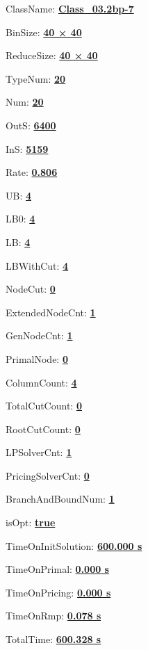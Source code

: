 \documentclass[11pt]{article}
\begin{document}
\pagestyle{empty}


ClassName: \underline{\textbf{Class_03.2bp-7}}
\par
BinSize: \underline{\textbf{40 × 40}}
\par
ReduceSize: \underline{\textbf{40 × 40}}
\par
TypeNum: \underline{\textbf{20}}
\par
Num: \underline{\textbf{20}}
\par
OutS: \underline{\textbf{6400}}
\par
InS: \underline{\textbf{5159}}
\par
Rate: \underline{\textbf{0.806}}
\par
UB: \underline{\textbf{4}}
\par
LB0: \underline{\textbf{4}}
\par
LB: \underline{\textbf{4}}
\par
LBWithCut: \underline{\textbf{4}}
\par
NodeCut: \underline{\textbf{0}}
\par
ExtendedNodeCnt: \underline{\textbf{1}}
\par
GenNodeCnt: \underline{\textbf{1}}
\par
PrimalNode: \underline{\textbf{0}}
\par
ColumnCount: \underline{\textbf{4}}
\par
TotalCutCount: \underline{\textbf{0}}
\par
RootCutCount: \underline{\textbf{0}}
\par
LPSolverCnt: \underline{\textbf{1}}
\par
PricingSolverCnt: \underline{\textbf{0}}
\par
BranchAndBoundNum: \underline{\textbf{1}}
\par
isOpt: \underline{\textbf{true}}
\par
TimeOnInitSolution: \underline{\textbf{600.000 s}}
\par
TimeOnPrimal: \underline{\textbf{0.000 s}}
\par
TimeOnPricing: \underline{\textbf{0.000 s}}
\par
TimeOnRmp: \underline{\textbf{0.078 s}}
\par
TotalTime: \underline{\textbf{600.328 s}}
\par
\newpage


\end{document}
